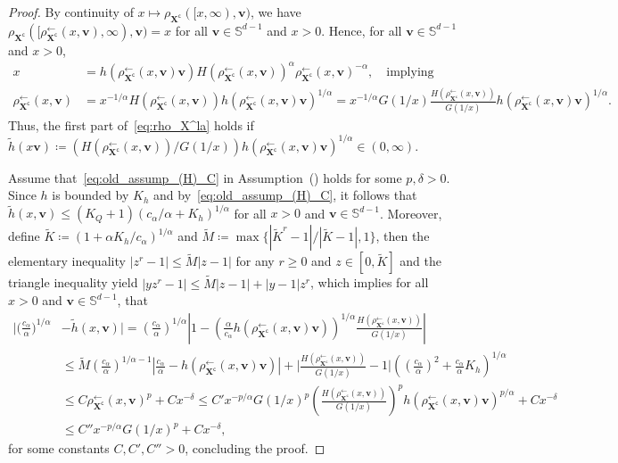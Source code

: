 \documentclass[en,oneside,bbfont,article]{amsart}
\theoremstyle{remark}
\theoremstyle{definition}
\theoremstyle{definition}
\newcommand\Sp{\mathbb{S}}
\newcommand\1{\mathds{1}}
\newcommand\la{\leftarrow}
\renewcommand\le{\leqslant}
\renewcommand\ge{\geqslant}
\newcommand\co{\mathsf{c}}
\newcommand{\wt}[1]{\widetilde{#1}}
\begin{document}
\begin{proof}
By continuity of $x\mapsto \rho_{\bm{X}^\co}([x,\infty),\bm{v})$, we have $\rho_{\bm{X}^{\co}}([\rho_{\bm{X}^\co}^{\la}(x,\bm{v}),\infty),\bm{v})
=x$ for all $\bm{v}\in \Sp^{d-1}$ and $x>0$. Hence, for all $\bm{v}\in \Sp^{d-1}$ and $x>0$,
\begin{align*}
x
&=h(\rho_{\bm{X}^\co}^{\la}(x,\bm{v})\bm{v}) H(\rho_{\bm{X}^\co}^{\la}(x,\bm{v}))^\alpha\rho_{\bm{X}^\co}^{\la}(x,\bm{v})^{-\alpha},
\quad\text{implying}\\
\rho_{\bm{X}^\co}^{\la}(x,\bm{v})
&=x^{-1/\alpha}H(\rho_{\bm{X}^\co}^{\la}(x,\bm{v}))h(\rho_{\bm{X}^\co}^{\la}(x,\bm{v})\bm{v})^{1/\alpha} =x^{-1/\alpha}G(1/x)\frac{H(\rho_{\bm{X}^\co}^{\la}(x,\bm{v}))}{G(1/x)}h(\rho_{\bm{X}^\co}^{\la}(x,\bm{v})\bm{v})^{1/\alpha}.
\end{align*}
Thus, the first part of~\eqref{eq:rho_X^la} holds if 
$\wt h(x\bm{v})\coloneqq (H(\rho_{\bm{X}^\co}^{\la}(x,\bm{v}))/G(1/x)) h(\rho_{\bm{X}^\co}^{\la}(x,\bm{v})\bm{v})^{1/\alpha} \in (0,\infty)$.

Assume that~\eqref{eq:old_assump_(H)_C} in Assumption~() holds for some $p,\delta>0$. Since $h$ is bounded by $K_h$ and by~\eqref{eq:old_assump_(H)_C}, it follows that $\wt h(x,\bm{v})\le (K_Q+1) (c_\alpha/\alpha+K_h)^{1/\alpha}$ for all $x>0$ and $\bm{v}\in \Sp^{d-1}$. Moreover, define $\wt K \coloneqq (1+\alpha K_h/c_\alpha)^{1/\alpha}$ and $\wt M \coloneqq \max\{|\wt K^r-1|/|\wt K-1|,1\}$, then the elementary inequality $|z^r-1|\le \wt M |z-1|$ for any $r \ge 0$ and $z\in [0,\wt K]$ and the triangle inequality yield $|y z^r-1|\le \wt M |z-1|+|y-1|z^r$, which implies for all $x>0$ and $\bm{v} \in \Sp^{d-1}$, that
\begin{align*}
\bigg|\bigg(\frac{c_\alpha}{\alpha}\bigg)^{1/\alpha}&-\wt h(x,\bm{v})\bigg|
=\left(\frac{c_\alpha}{\alpha}\right)^{1/\alpha} \left|1-\left(\frac{\alpha}{c_\alpha}h(\rho_{\bm{X}^\co}^{\la}(x,\bm{v})\bm{v})\right)^{1/\alpha}\frac{H(\rho_{\bm{X}^\co}^{\la}(x,\bm{v}))}{G(1/x)}  \right| \\
&\le \wt M \left(\frac{c_\alpha}{\alpha}\right)^{1/\alpha-1} \left|\frac{c_\alpha}{\alpha}-h(\rho_{\bm{X}^\co}^{\la}(x,\bm{v})\bm{v})\right|+\bigg|\frac{H(\rho_{\bm{X}^\co}^{\la}(x,\bm{v}))}{G(1/x)}-1\bigg| 
\left(\left(\frac{c_\alpha}{\alpha}\right)^2+\frac{c_\alpha}{\alpha}K_h\right)^{1/\alpha}\\
&\le C \rho_{\bm{X}^\co}^{\la}(x,\bm{v})^p+C x^{-\delta} \le C' x^{-p/\alpha}G(1/x)^p \left( \frac{H(\rho_{\bm{X}^\co}^{\la}(x,\bm{v}))}{G(1/x)}\right)^p h(\rho_{\bm{X}^\co}^{\la}(x,\bm{v})\bm{v})^{p/\alpha}+Cx^{-\delta}\\
& \le %
C'' x^{-p/\alpha}G(1/x)^p+%
C x^{-\delta},
\end{align*} for some constants $C, C',C''>0$, concluding the proof. %
\end{proof}
\end{document}
